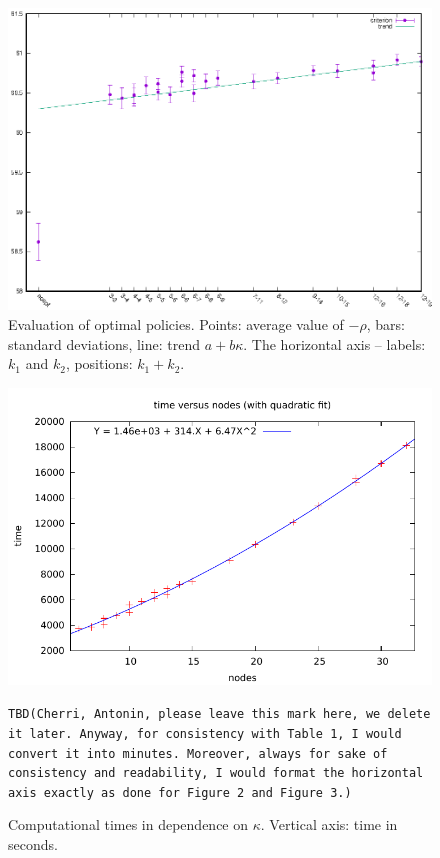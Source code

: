\documentclass{article}              %
\begin{document}
\begin{figure}
\begin{center}
\includegraphics{mcvs025}

\caption{Evaluation of optimal policies. Points: average value of $-\rho$, bars: standard deviations, line: trend $a+b\kappa$. The horizontal axis -- labels: $k_1$ and $k_2$, positions: $k_1+k_2$. }


\label{fig:mcvs}
\end{center}
\end{figure}

\begin{figure}
\begin{center}
\includegraphics{times}\caption{Computational times in dependence on $\kappa$. Vertical axis: time in seconds. }
\label{fig:times}

{\tt TBD(Cherri, Antonin, please leave this mark here, we delete it later. Anyway, for consistency with Table 1, I would convert it into minutes. Moreover, always for
sake of consistency and readability, I would format the horizontal axis exactly as done for
Figure 2 and Figure 3.)}
\end{center}
\end{figure}
\end{document}
